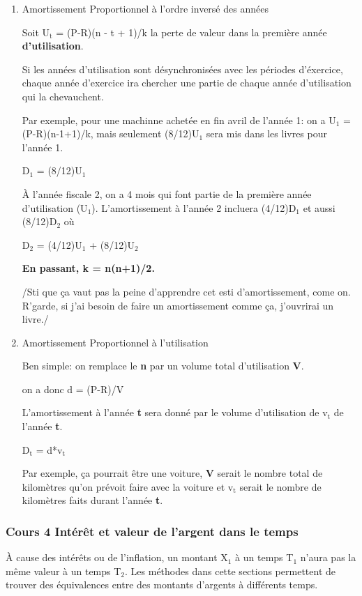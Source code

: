 \documentclass[11pt]{article}
\begin{document}
\begin{enumerate}
\begin{enumerate}
\item Amortissement Proportionnel à l'ordre inversé des années
\label{sec:org9c99146}

Soit U\(_{\text{t}}\) = (P-R)(n - t + 1)/k la perte de valeur dans la première année \textbf{d'utilisation}.

Si les années d'utilisation sont désynchronisées avec les périodes d'éxercice,
chaque année d'exercice ira chercher une partie de chaque année d'utilisation qui
la chevauchent.

Par exemple, pour une machinne achetée en fin avril de l'année 1: on a
U\(_{\text{1}}\) = (P-R)(n-1+1)/k, mais seulement (8/12)U\(_{\text{1}}\) sera mis dans les livres pour
l'année 1.

D\(_{\text{1}}\) = (8/12)U\(_{\text{1}}\)

À l'année fiscale 2, on a 4 mois qui font partie de la première année
d'utilisation (U\(_{\text{1}}\)).  L'amortissement à l'année 2 incluera (4/12)D\(_{\text{1}}\) et aussi (8/12)D\(_{\text{2}}\)
où

D\(_{\text{2}}\) = (4/12)U\(_{\text{1}}\) + (8/12)U\(_{\text{2}}\)

\textbf{En passant, k = n(n+1)/2.}

/Sti que ça vaut pas la peine d'apprendre cet esti d'amortissement, come on.
R'garde, si j'ai besoin de faire un amortissement comme ça, j'ouvrirai un
livre./


\item Amortissement Proportionnel à l'utilisation
\label{sec:org2613e5d}

Ben simple: on remplace le \textbf{n} par un volume total d'utilisation \textbf{V}.

on a donc d = (P-R)/V

L'amortissement à l'année \textbf{t} sera donné par le volume d'utilisation de v\(_{\text{t}}\) de
l'année \textbf{t}.

D\(_{\text{t}}\) = d*v\(_{\text{t}}\)

Par exemple, ça pourrait être une voiture, \textbf{V} serait le nombre total de
kilomètres qu'on prévoit faire avec la voiture et v\(_{\text{t}}\) serait le nombre de
kilomètres faits durant l'année \textbf{t}.
\end{enumerate}
\end{enumerate}

\subsubsection{Cours 4 Intérêt et valeur de l'argent dans le temps}
\label{sec:org04ea299}
À cause des intérêts ou de l'inflation, un montant X\(_{\text{1}}\) à un temps T\(_{\text{1}}\) n'aura pas
la même valeur à un temps T\(_{\text{2}}\).  Les méthodes dans cette sections permettent de
trouver des équivalences entre des montants d'argents à différents temps.
\end{document}
